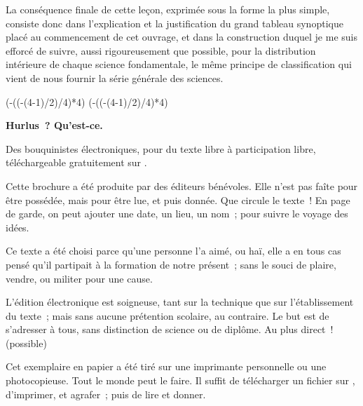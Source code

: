 \documentclass[french,twoside]{book} %
\newcommand\chapterclose{} %
\def\truncdiv#1#2{((#1-(#2-1)/2)/#2)}
\def\moduloop#1#2{(#1-\truncdiv{#1}{#2}*#2)}
\def\modulo#1#2{\number\numexpr\moduloop{#1}{#2}\relax}
\begin{document}
La conséquence finale de cette leçon, exprimée sous la forme la plus simple, consiste donc dans l’explication et la justification du grand tableau synoptique placé au commencement de cet ouvrage, et dans la construction duquel je me suis efforcé de suivre, aussi rigoureusement que possible, pour la distribution intérieure de chaque science fondamentale, le même principe de classification qui vient de nous fournir la série générale des sciences.
\chapterclose

 


\ifbooklet
  \pagestyle{empty}
  \clearpage
  \ifnum\modulo{\value{page}}{4}=0 \hbox{}\newpage\hbox{}\newpage\fi
  \ifnum\modulo{\value{page}}{4}=1 \hbox{}\newpage\hbox{}\newpage\fi


  \hbox{}\newpage
  \ifodd\value{page}\hbox{}\newpage\fi
  {\centering\color{rubric}\bfseries\noindent\large
    Hurlus ? Qu’est-ce.\par
    \bigskip
  }
  \noindent Des bouquinistes électroniques, pour du texte libre à participation libre,
  téléchargeable gratuitement sur \href{https://hurlus.fr}{}.\par
  \bigskip
  \noindent Cette brochure a été produite par des éditeurs bénévoles.
  Elle n’est pas faîte pour être possédée, mais pour être lue, et puis donnée.
  Que circule le texte !
  En page de garde, on peut ajouter une date, un lieu, un nom ; pour suivre le voyage des idées.
  \par

  Ce texte a été choisi parce qu’une personne l’a aimé,
  ou haï, elle a en tous cas pensé qu’il partipait à la formation de notre présent ;
  sans le souci de plaire, vendre, ou militer pour une cause.
  \par

  L’édition électronique est soigneuse, tant sur la technique
  que sur l’établissement du texte ; mais sans aucune prétention scolaire, au contraire.
  Le but est de s’adresser à tous, sans distinction de science ou de diplôme.
  Au plus direct ! (possible)
  \par

  Cet exemplaire en papier a été tiré sur une imprimante personnelle
   ou une photocopieuse. Tout le monde peut le faire.
  Il suffit de
  télécharger un fichier sur \href{https://hurlus.fr}{},
  d’imprimer, et agrafer ; puis de lire et donner.\par
\end{document}
